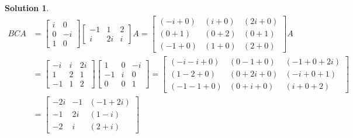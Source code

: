 \documentclass{article}
\theoremstyle{definition}
\newtheorem*{solution}{Solution}
\begin{document}
\begin{solution}
\begin{align*}
BCA&=
\begin{bmatrix}
i & 0 \\
0 & -i \\
1 & 0
\end{bmatrix}
\begin{bmatrix}
-1 & 1 & 2 \\
i & 2i & i
\end{bmatrix} A =
\begin{bmatrix}
(-i+0) & (i+0) & (2i+0) \\
(0+1) & (0+2) & (0+1) \\
(-1+0) & (1+0) & (2+0)
\end{bmatrix} A \\
&=
\begin{bmatrix}
-i & i & 2i \\
1&2&1\\
-1&1&2
\end{bmatrix}
\begin{bmatrix}
1 & 0 & -i \\
-1 & i & 0 \\
0 & 0 & 1
\end{bmatrix} =
\begin{bmatrix}
(-i-i+0)&(0-1+0)&(-1+0+2i)\\
(1-2+0)&(0+2i+0)&(-i+0+1)\\
(-1-1+0)&(0+i+0)&(i+0+2)
\end{bmatrix} \\
&=
\boxed{
\begin{bmatrix}
-2i&-1&(-1+2i)\\
-1&2i&(1-i)\\
-2&i&(2+i)
\end{bmatrix}}
\end{align*}


\end{solution}
\end{document}
